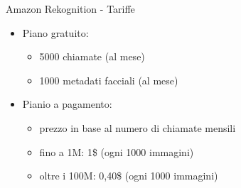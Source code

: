 %
\begin{frame}[t]{Amazon Rekognition - Tariffe}
\begin{itemize}
	\item Piano gratuito:
	\begin{itemize}
		\item 5000 chiamate (al mese)
		\item 1000 metadati facciali (al mese)
	\end{itemize}
	\item Pianio a pagamento:
	\begin{itemize}
		\item prezzo in base al numero di chiamate mensili
		\item fino a 1M: 1\$ (ogni 1000 immagini)
		\item oltre i 100M: 0,40\$ (ogni 1000 immagini)
	\end{itemize}
\end{itemize}
\end{frame}
%
